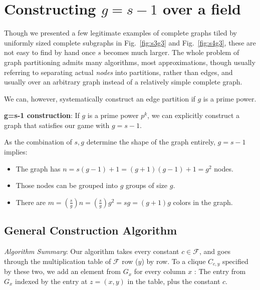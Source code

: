 \documentclass[11pt, oneside]{article} 	%
\begin{document}
\section{Constructing $g = s-1$ over a field}

Though we presented a few legitimate examples of complete graphs tiled by uniformly sized complete subgraphs in Fig.~\ref{fig:s3g3} and Fig.~\ref{fig:s4g3}, these are not easy to find by hand once $s$ becomes much larger. The whole problem of graph partitioning admits many algorithms, most approximations\cite{3}, though usually referring to separating actual \emph{nodes} into partitions, rather than edges, and usually over an arbitrary graph instead of a relatively simple complete graph.

We can, however, systematically construct an edge partition if $g$ is a prime power.

\begin{framed}
\textbf{g=s-1 construction}: If $g$ is a prime power $p^k$, we can explicitly construct a graph that satisfies our game with $g = s-1$.
\end{framed}


As the combination of $s, g$ determine the shape of the graph entirely, $g = s-1$ implies:
\begin{itemize}
\item The graph has $n = s(g-1) + 1 = (g+1)(g-1) + 1 = g^2$ nodes.
\item Those nodes can be grouped into $g$ groups of size $g$.
\item There are $m = (\frac{s}{g}) n = (\frac{s}{g}) g ^2 = sg = (g+1)g$ colors in the graph.
\end{itemize}

\subsection{General Construction Algorithm}
\emph{Algorithm Summary}: Our algorithm takes every constant $c \in \mathcal{F}$, and goes through the multiplication table of $\mathcal{F}$ row ($y$) by row. To a clique $C_{c,y}$ specified by these two, we add an element from $G_x$ for every column $x$ : The entry from $G_x$ indexed by the entry at $z = (x,y)$ in the table, plus the constant $c$.
\end{document}
